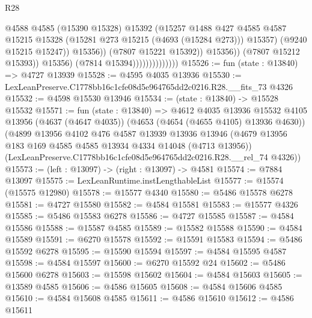 \begin{lexlean}{R28}
\begin{coremodule}
                                              @4588
                                              @4585
                                              (@15390 @15328)
                                              @15392
                                              (@15257
                                                @1488
                                                @427
                                                @4585
                                                @4587
                                                @15215
                                                @15328
                                                (@15281 @273 @15215 (@4693 (@15284 @273)))
                                                @15357)
                                              (@9240 @15215 @15247))
                                            @15356))
                                        (@7807 @15221 @15392))
                                      @15356))
                                  (@7807 @15212 @15393))
                                @15356)
                              (@7814 @15394))))))))))))))
@15526 := fun (state : @13840) => @4727 @13939
@15528 := @4595 @4035 @13936
@15530 := LexLeanPreserve.C1778bb16c1cfe08d5e964765dd2c0216.R28.__fits_73 @4326
@15532 := @4598 @15530 @13946
@15534 := (state : @13840) -> @15528 @15532
@15571 := fun (state : @13840) =>
  @4612
    @4035
    @13936
    @15532
    @4105
    @13956
    (@4637 (@4647 @4035))
    (@4653 (@4654 (@4655 @4105) @13936 @4630))
    (@4899
      @13956
      @4102
      @476
      @4587
      @13939
      @13936
      @13946
      (@4679 @13956 @183 @169 @4585 @4585 @13934 @4334 @14048 (@4713 @13956))
      (LexLeanPreserve.C1778bb16c1cfe08d5e964765dd2c0216.R28.__rel_74 @4326))
@15573 := (left : @13097) -> (right : @13097) -> @4581
@15574 := @7884 @13097
@15575 := LexLeanRuntime.instLengthableList
@15577 := @15574 (@15575 @12980)
@15578 := @15577 @4340
@15580 := @5486 @15578 @6278
@15581 := @4727 @15580
@15582 := @4584 @15581
@15583 := @15577 @4326
@15585 := @5486 @15583 @6278
@15586 := @4727 @15585
@15587 := @4584 @15586
@15588 := @15587 @4585
@15589 := @15582 @15588
@15590 := @4584 @15589
@15591 := @6270 @15578
@15592 := @15591 @15583
@15594 := @5486 @15592 @6278
@15595 := @15590 @15594
@15597 := @4584 @15595 @4587
@15598 := @4584 @15597
@15600 := @6270 @15592 @24
@15602 := @5486 @15600 @6278
@15603 := @15598 @15602
@15604 := @4584 @15603
@15605 := @13589 @4585
@15606 := @4586 @15605
@15608 := @4584 @15606 @4585
@15610 := @4584 @15608 @4585
@15611 := @4586 @15610
@15612 := @4586 @15611

\end{coremodule}
\end{lexlean}
